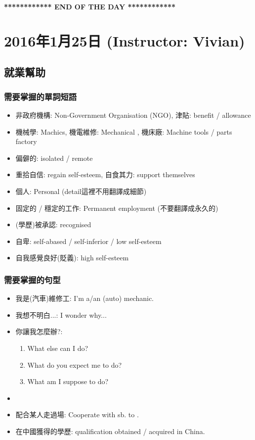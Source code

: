 \vspace{15mm}

\begin{center}
  \textbf{************ END OF THE DAY ************}
\end{center}
\newpage

\section{2016年1月25日 (Instructor: Vivian)}
\subsection{就業幫助}
\subsubsection*{需要掌握的單詞短語}
\begin{itemize}
  \itemsep0em
  \item 非政府機構: Non-Government Organisation (NGO), 津貼: benefit / allowance
  \item 機械學: Machics, 機電維修: Mechanical , 機床廠: Machine tools / parts factory
  \item 偏僻的: isolated / remote
  \item 重拾自信: regain self-esteem, 自食其力: support themselves
  \item 個人: Personal  (detail這裡不用翻譯成細節)
  \item 固定的 / 穩定的工作: Permanent employment (不要翻譯成永久的)
  \item (學歷)被承認: recognised
  \item 自卑: self-abased / self-inferior / low self-esteem
  \item 自我感覺良好(貶義): high self-esteem
\end{itemize}

\subsubsection*{需要掌握的句型}
\begin{itemize}
  \itemsep0em
  \item 我是(汽車)維修工: I'm a/an (auto) mechanic.
  \item 我想不明白...: I wonder why...
  \item 你讓我怎麼辦?:
  \begin{enumerate}
    \itemsep0em
    \item What else can I do?
    \item What do you expect me to do?
    \item What am I suppose to do?
  \end{enumerate}
  \item {}
  \item 配合某人走過場: Cooperate with sb. to .
  \item 在中國獲得的學歷: qualification obtained / acquired in China.
\end{itemize}

